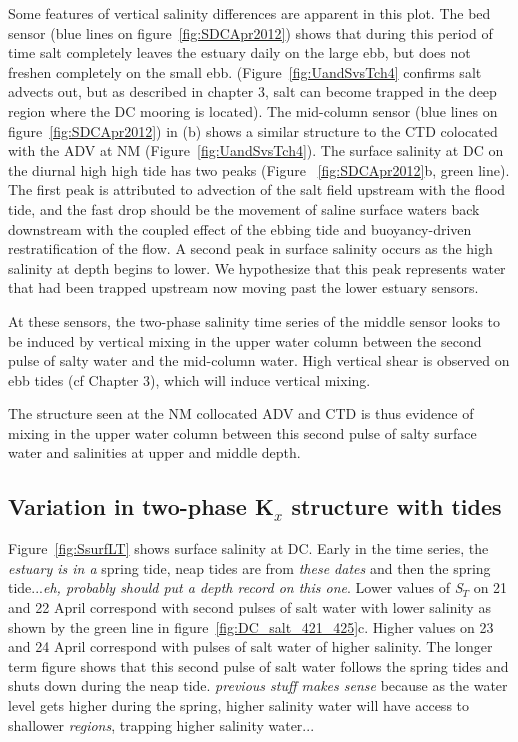 Some features of vertical salinity differences are apparent in this plot. The bed sensor (blue lines on figure~\ref{fig:SDCApr2012}) shows that during this period of time salt completely leaves the estuary daily on the large ebb, but does not freshen completely on the small ebb. (Figure~\ref{fig:UandSvsTch4} confirms salt advects out, but as described in chapter 3, salt can become trapped in the deep region where the DC mooring is located). The mid-column sensor (blue lines on figure~\ref{fig:SDCApr2012}) in (b) shows a similar structure to the CTD colocated with the ADV at NM (Figure~\ref{fig:UandSvsTch4}). The surface salinity at DC on the diurnal high high tide has two peaks (Figure ~\ref{fig:SDCApr2012}b, green line). The first peak is attributed to advection of the salt field upstream with the flood tide, and the fast drop should be the movement of saline surface waters back downstream with the coupled effect of the ebbing tide and buoyancy-driven restratification of the flow. A second peak in surface salinity occurs as the high salinity at depth begins to lower. We hypothesize that this peak represents water that had been trapped upstream now moving past the lower estuary sensors. 

At these sensors, the two-phase salinity time series of the middle sensor looks to be induced by vertical mixing in the upper water column between the second pulse of salty water and the mid-column water. High vertical shear is observed on ebb tides (cf Chapter 3), which will induce vertical mixing. 

The structure seen at the NM collocated ADV and CTD is thus evidence of mixing in the upper water column between this second pulse of salty surface water and salinities at upper and middle depth.

\subsection{Variation in two-phase K$_x$ structure with tides}
Figure~\ref{fig:SsurfLT} shows surface salinity at DC. Early in the time series, the \emph{estuary is in a} spring tide, neap tides are from \emph{these dates} and then the spring tide...\emph{eh, probably should put a depth record on this one}. Lower values of \emph{S$_T$} on 21 and 22 April correspond with second pulses of salt water with lower salinity as shown by the green line in figure~\ref{fig:DC_salt_421_425}c. Higher values on 23 and 24 April correspond with pulses of salt water of higher salinity. The longer term figure shows that this second pulse of salt water follows the spring tides and shuts down during the neap tide. \emph{previous stuff makes sense} because as the water level gets higher during the spring, higher salinity water will have access to shallower \emph{regions}, trapping higher salinity water... 


